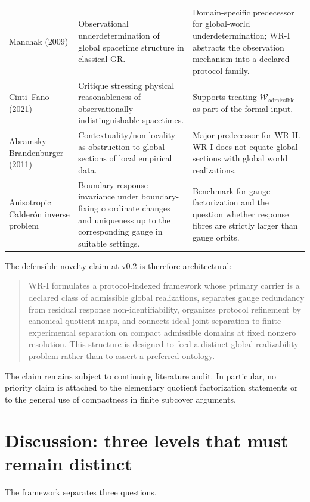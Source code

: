 \documentclass[11pt]{article}
\newcommand{\W}{\mathcal W}
\begin{document}
\begin{longtable}{>{\raggedright\arraybackslash}p{}
                  >{\raggedright\arraybackslash}p{}
                  >{\raggedright\arraybackslash}p{}}
Manchak (2009) &
Observational underdetermination of global spacetime structure in classical
GR. &
Domain-specific predecessor for global-world underdetermination; WR-I abstracts
the observation mechanism into a declared protocol family. \\[5pt]

Cinti--Fano (2021) &
Critique stressing physical reasonableness of observationally indistinguishable
spacetimes. &
Supports treating $\W_{\mathrm{admissible}}$ as part of the formal input. \\[5pt]

Abramsky--Brandenburger (2011) &
Contextuality/non-locality as obstruction to global sections of local empirical
data. &
Major predecessor for WR-II. WR-I does not equate global sections with global
world realizations. \\[5pt]

Anisotropic Calder\'on inverse problem &
Boundary response invariance under boundary-fixing coordinate changes and
uniqueness up to the corresponding gauge in suitable settings. &
Benchmark for gauge factorization and the question whether response fibres are
strictly larger than gauge orbits. \\
\bottomrule
\end{longtable}

The defensible novelty claim at v0.2 is therefore architectural:
\begin{quote}
WR-I formulates a protocol-indexed framework whose primary carrier is a
declared class of admissible global realizations, separates gauge redundancy
from residual response non-identifiability, organizes protocol refinement by
canonical quotient maps, and connects ideal joint separation to finite
experimental separation on compact admissible domains at fixed nonzero
resolution. This structure is designed to feed a distinct global-realizability
problem rather than to assert a preferred ontology.
\end{quote}

The claim remains subject to continuing literature audit. In particular, no
priority claim is attached to the elementary quotient factorization statements
or to the general use of compactness in finite subcover arguments.

\section{Discussion: three levels that must remain distinct}

The framework separates three questions.
\end{document}
